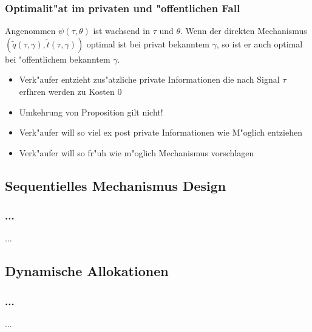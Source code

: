 \begin{frame}
\frametitle{Optimalit"at im privaten und "offentlichen Fall}
\justifying
\begin{thmP}
  Angenommen $\psi(\tau, \theta)$ ist wachsend in $\tau$ und $\theta$. Wenn der direkten Mechanismus $(\tilde{q}(\tau, \gamma), \tilde{t}(\tau, \gamma))$ optimal ist bei privat bekanntem $\gamma$, so ist er
  auch optimal bei "offentlichem bekanntem $\gamma$.
\end{thmP}
\begin{itemize}
  \item Verk"aufer entzieht zus"atzliche private Informationen die nach Signal $\tau$ erfhren werden zu Kosten $0$
  \item Umkehrung von Proposition gilt nicht!
  \item Verk"aufer will so viel ex post private Informationen wie M"oglich entziehen
  \item Verk"aufer will so fr"uh wie m"oglich Mechanismus vorschlagen
\end{itemize}
\end{frame}

\subsection{Sequentielles Mechanismus Design}
\begin{frame}
\frametitle{...}
\justifying
...

\end{frame}

\subsection{Dynamische Allokationen}
\begin{frame}
\frametitle{...}
\justifying
...

\end{frame}
